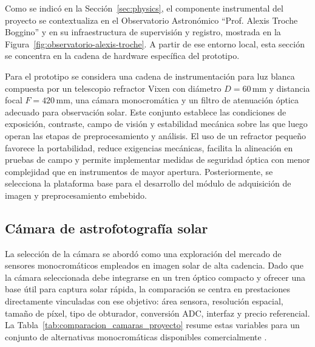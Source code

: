 Como se indicó en la Sección~\ref{sec:physics}, el componente instrumental del proyecto se contextualiza en el Observatorio Astronómico ``Prof. Alexis Troche Boggino'' y en su infraestructura de supervisión y registro, mostrada en la Figura~\ref{fig:observatorio-alexis-troche}. A partir de ese entorno local, esta sección se concentra en la cadena de hardware específica del prototipo.

Para el prototipo se considera una cadena de instrumentación para luz blanca compuesta por un telescopio refractor Vixen con diámetro $D=60\,\mathrm{mm}$ y distancia focal $F=420\,\mathrm{mm}$, una cámara monocromática y un filtro de atenuación óptica adecuado para observación solar. Este conjunto establece las condiciones de exposición, contraste, campo de visión y estabilidad mecánica sobre las que luego operan las etapas de preprocesamiento y análisis. El uso de un refractor pequeño favorece la portabilidad, reduce exigencias mecánicas, facilita la alineación en pruebas de campo y permite implementar medidas de seguridad óptica con menor complejidad que en instrumentos de mayor apertura. Posteriormente, se selecciona la plataforma base para el desarrollo del módulo de adquisición de imagen y preprocesamiento embebido.

\subsection{Cámara de astrofotografía solar}

La selección de la cámara se abordó como una exploración del mercado de sensores monocromáticos empleados en imagen solar de alta cadencia. Dado que la cámara seleccionada debe integrarse en un tren óptico compacto y ofrecer una base útil para captura solar rápida, la comparación se centra en prestaciones directamente vinculadas con ese objetivo: área sensora, resolución espacial, tamaño de píxel, tipo de obturador, conversión ADC, interfaz y precio referencial. La Tabla~\ref{tab:comparacion_camaras_proyecto} resume estas variables para un conjunto de alternativas monocromáticas disponibles comercialmente \citep{zwoASI174Manual2025,zwoGuideCameras2025,qhyQHY5III6782026,qhyMiniCAM8M2026,playerOneApolloMMax2026}.

